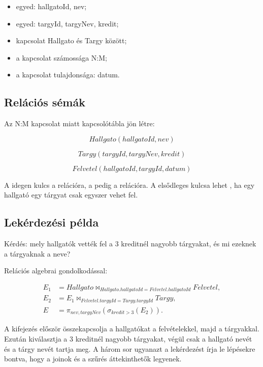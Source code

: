\begin{itemize}
  \item {} egyed: hallgatoId, nev;
  \item {} egyed: targyId, targyNev, kredit;
  \item {} kapcsolat Hallgato és Targy között;
  \item a kapcsolat számossága N:M;
  \item a kapcsolat tulajdonsága: datum.
\end{itemize}

\subsection{Relációs sémák}

Az N:M kapcsolat miatt kapcsolótábla jön létre:

\[
  Hallgato(hallgatoId, nev)
\]

\[
  Targy(targyId, targyNev, kredit)
\]

\[
  Felvetel(hallgatoId, targyId, datum)
\]

A  idegen kulcs a  relációra, a  pedig a  relációra. A  elsődleges kulcsa lehet , ha egy hallgató egy tárgyat csak egyszer vehet fel.

\subsection{Lekérdezési példa}

Kérdés: mely hallgatók vették fel a 3 kreditnél nagyobb tárgyakat, és mi ezeknek a tárgyaknak a neve?

Relációs algebrai gondolkodással:

\begin{align*}
  E_1 &= Hallgato \bowtie_{Hallgato.hallgatoId = Felvetel.hallgatoId} Felvetel,\\
  E_2 &= E_1 \bowtie_{Felvetel.targyId = Targy.targyId} Targy,\\
  E &= \pi_{nev,targyNev}(\sigma_{kredit > 3}(E_2)).
\end{align*}

A kifejezés először összekapcsolja a hallgatókat a felvételekkel, majd a tárgyakkal. Ezután kiválasztja a 3 kreditnél nagyobb tárgyakat, végül csak a hallgató nevét és a tárgy nevét tartja meg. A három sor ugyanazt a lekérdezést írja le lépésekre bontva, hogy a joinok és a szűrés áttekinthetők legyenek.

